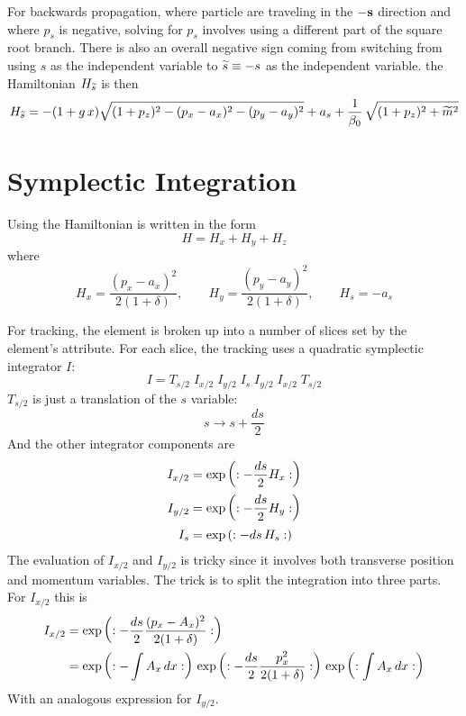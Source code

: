 For backwards propagation, where particle are traveling in the $-{\bf s}$ direction and where $p_s$ is negative, solving for $p_s$ involves
using a different part of the square root branch. There is also an
overall negative sign coming from switching from using $s$ as the
independent variable to $\widetilde s \equiv -s$ as the independent
variable. the Hamiltonian $H_{\widetilde s}$ is then
\begin{equation}
  H_{\widetilde s} = -(1 + g \, x) \sqrt{(1 + p_z)^2 - (p_x - a_x)^2 - (p_y - a_y)^2} + 
  a_s + \frac{1}{\beta_0} \, \sqrt{(1+p_z)^2 + \widetilde m^2}
\end{equation}

\section{Symplectic Integration}
\label{s:symp.track}

Using  the Hamiltonian is written in the form
\begin{equation}
  H = H_x + H_y + H_z
\end{equation}
where
\begin{equation}
  H_x = \frac{(p_x - a_x)^2}{2 (1 + \delta)}, \qquad
  H_y = \frac{(p_y - a_y)^2}{2 (1 + \delta)}, \qquad
  H_s = - a_s 
\end{equation}

For tracking, the element is broken up into a number of slices set by
the element's  attribute. For each slice, the tracking
uses a quadratic symplectic integrator $I$:
\begin{equation}
  I = T_{s/2} \; I_{x/2} \; I_{y/2} \; I_s \; I_{y/2} \; I_{x/2} \; T_{s/2}
\end{equation}
$T_{s/2}$ is just a translation of the $s$ variable:
\begin{equation}
  s \rightarrow s + \frac{ds}{2}
\end{equation}
And the other integrator components are
\begin{align}
  I_{x/2} &= \exp \left( : -\frac{ds}{2} H_x : \right) \nonumber \\
  I_{y/2} &= \exp \left( : -\frac{ds}{2} H_y : \right) \\
  I_{s}   &= \exp \left( : -ds \, H_s : \right) \nonumber
\end{align}
The evaluation of $I_{x/2}$ and $I_{y/2}$ is tricky since it involves both transverse
position and momentum variables. The trick is to split the integration into three parts.
For $I_{x/2}$ this is
\begin{align}
  I_{x/2} &= \exp \left( : -\frac{ds}{2} \frac{(p_x - A_x)^2}{2 (1 + \delta)} : \right) \nonumber \\
  &= \exp \left( : -\int A_x \, dx : \right) \,
     \exp \left( : -\frac{ds}{2} \frac{p_x^2}{2 (1 + \delta)} : \right) \,
     \exp \left( : \int A_x \, dx : \right)
  \label{ids2}
\end{align}
With an analogous expression for $I_{y/2}$.

